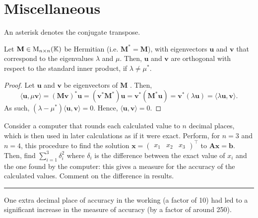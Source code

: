 \documentclass[../Notes.tex]{subfiles}
\begin{document}
\section{Miscellaneous}
An asterisk denotes the conjugate transpose.
\begin{theorem}{}{}
    Let \(\mathbf{M}\in\operatorname{M}_{n \times n}(\mathbb{K})\) be Hermitian (i.e. \(\mathbf{M}^{*}=\mathbf{M}\)), with eigenvectors \(\mathbf{u}\) and \(\mathbf{v}\) that correspond to the eigenvalues \(\lambda\) and \(\mu\). Then, \(\mathbf{u}\) and \(\mathbf{v}\) are orthogonal with respect to the standard inner product, if \(\lambda\neq\mu^{*}\). 
\end{theorem}
\begin{proof}
    Let \(\mathbf{u}\) and \(\mathbf{v}\) be eigenvectors of \(\mathbf{M}\) . Then, 
    \[\langle \mathbf{u},\mu\mathbf{v} \rangle=(\mathbf{M} \mathbf{v})^{*}\mathbf{u}=(\mathbf{v}^{*}\mathbf{M}^{*})\mathbf{u}=\mathbf{v}^{*}(\mathbf{M}^{*}\mathbf{u})=\mathbf{v}^{*}(\lambda \mathbf{u})=\langle \lambda \mathbf{u},\mathbf{v} \rangle.\]
    As such, \((\lambda-\mu^{*})\langle \mathbf{u},\mathbf{v} \rangle=0\). Hence, \(\langle \mathbf{u},\mathbf{v} \rangle=0\).
\end{proof}
\begin{example}{}{}
    Consider a computer that rounds each calculated value to \(n\) decimal places, which is then used in later calculations as if it were exact. Perform, for \(n=3\) and \(n=4\), this procedure to find the solution \(\mathbf{x}=
    \begin{pmatrix}
        x_1 & x_2 & x_3
    \end{pmatrix}^\top\) to \(\mathbf{A}\mathbf{x}=\mathbf{b}\). Then, find \(\sum_{i=1}^{3}{\delta_i^2}\) where \(\delta_i\) is the difference between the exact value of \(x_i\) and the one found by the computer: this gives a measure for the accuracy of the calculated values. Comment on the difference in results.

    \rule{20cm-137.0549pt}{0.05mm}

    \vspace{0.5\baselineskip} One extra decimal place of accuracy in the working (a factor of 10) had led to a significant increase in the measure of accuracy (by a factor of around 250). 
\end{example}
\newpage
\end{document}
